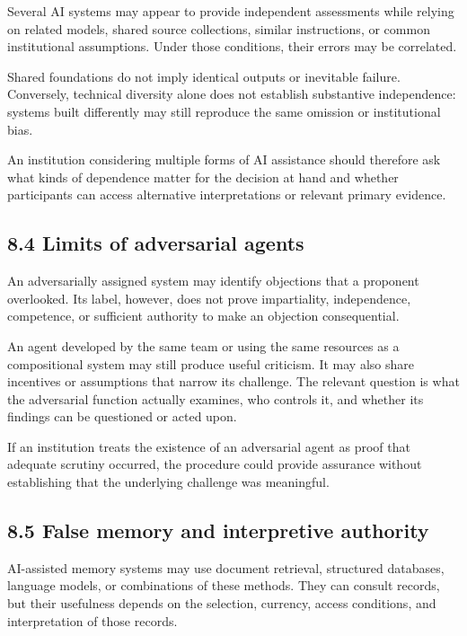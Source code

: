 \documentclass[
  10pt,
]{article}
\begin{document}
Several AI systems may appear to provide independent assessments while
relying on related models, shared source collections, similar
instructions, or common institutional assumptions. Under those
conditions, their errors may be correlated.

Shared foundations do not imply identical outputs or inevitable failure.
Conversely, technical diversity alone does not establish substantive
independence: systems built differently may still reproduce the same
omission or institutional bias.

An institution considering multiple forms of AI assistance should
therefore ask what kinds of dependence matter for the decision at hand
and whether participants can access alternative interpretations or
relevant primary evidence.

\subsection{8.4 Limits of adversarial
agents}\label{limits-of-adversarial-agents}

An adversarially assigned system may identify objections that a
proponent overlooked. Its label, however, does not prove impartiality,
independence, competence, or sufficient authority to make an objection
consequential.

An agent developed by the same team or using the same resources as a
compositional system may still produce useful criticism. It may also
share incentives or assumptions that narrow its challenge. The relevant
question is what the adversarial function actually examines, who
controls it, and whether its findings can be questioned or acted upon.

If an institution treats the existence of an adversarial agent as proof
that adequate scrutiny occurred, the procedure could provide assurance
without establishing that the underlying challenge was meaningful.

\subsection{8.5 False memory and interpretive
authority}\label{false-memory-and-interpretive-authority}

AI-assisted memory systems may use document retrieval, structured
databases, language models, or combinations of these methods. They can
consult records, but their usefulness depends on the selection,
currency, access conditions, and interpretation of those records.
\end{document}
